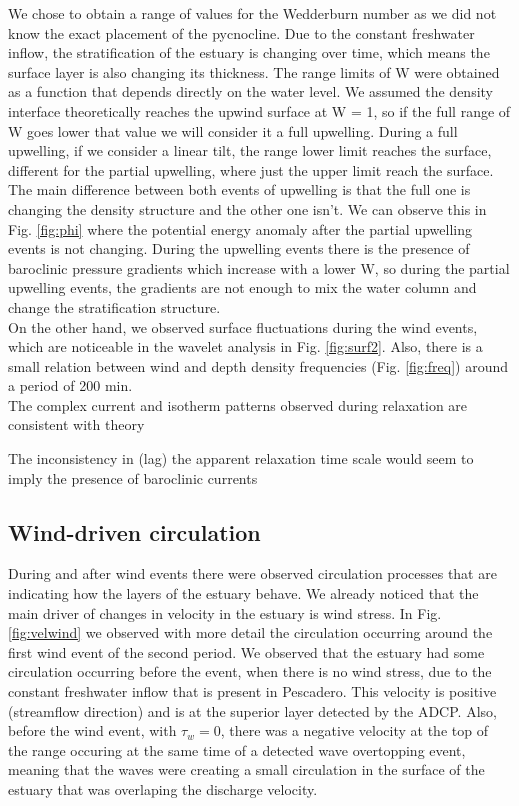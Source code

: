 \documentclass[tesis.tex]{subfiles}
\begin{document}
We chose to obtain a range of values for the Wedderburn number as we did not know the exact placement of the pycnocline. Due to the constant freshwater inflow, the stratification of the estuary is changing over time, which means the surface layer is also changing its thickness. The range limits of W were obtained as a function that depends directly on the water level. We assumed the density interface theoretically reaches the upwind surface at W = 1, so if the full range of W goes lower that value we will consider it a full upwelling. During a full upwelling, if we consider a linear tilt, the range lower limit reaches the surface, different for the partial upwelling, where just the upper limit reach the surface. The main difference between both events of upwelling is that the full one is changing the density structure and the other one isn't. We can observe this in Fig. \ref{fig:phi} where the potential energy anomaly after the partial upwelling events is not changing. During the upwelling events there is the presence of baroclinic pressure gradients which increase with a lower W, so during the partial upwelling events, the gradients are not enough to mix the water column and change the stratification structure.\\

On the other hand, we observed surface fluctuations during the wind events, which are noticeable in the wavelet analysis in Fig. \ref{fig:surf2}. Also, there is a small relation between wind and depth density frequencies (Fig. \ref{fig:freq}) around a period of 200 min.\\

The complex current and isotherm patterns observed during relaxation are consistent with theory

The inconsistency in (lag) the apparent relaxation time scale would seem to imply the presence of baroclinic currents

\subsection{Wind-driven circulation}

During and after wind events there were observed circulation processes that are indicating how the layers of the estuary behave. We already noticed that the main driver of changes in velocity in the estuary is wind stress. In Fig. \ref{fig:velwind} we observed with more detail the circulation occurring around the first wind event of the second period. We observed that the estuary had some circulation occurring before the event, when there is no wind stress, due to the constant freshwater inflow that is present in Pescadero. This velocity is positive (streamflow direction) and is at the superior layer detected by the ADCP. Also, before the wind event, with $\tau_w =0$, there was a negative velocity at the top of the range occuring at the same time of a detected wave overtopping event, meaning that the waves were creating a small circulation in the surface of the estuary that was overlaping the discharge velocity.\\
\end{document}
